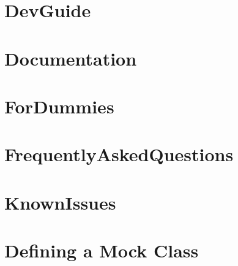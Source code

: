 \documentclass[twoside]{book}
\newcommand{\+}{\discretionary{\mbox{\scriptsize$\hookleftarrow$}}{}{}}
\begin{document}
\chapter{Dev\+Guide}
\label{md__home_bhargavi_Documents_SDR_Copy_Exam_808X_vendor_googletest_googlemock_docs_DevGuide}
\hypertarget{md__home_bhargavi_Documents_SDR_Copy_Exam_808X_vendor_googletest_googlemock_docs_DevGuide}{}

\chapter{Documentation}
\label{md__home_bhargavi_Documents_SDR_Copy_Exam_808X_vendor_googletest_googlemock_docs_Documentation}
\hypertarget{md__home_bhargavi_Documents_SDR_Copy_Exam_808X_vendor_googletest_googlemock_docs_Documentation}{}

\chapter{For\+Dummies}
\label{md__home_bhargavi_Documents_SDR_Copy_Exam_808X_vendor_googletest_googlemock_docs_ForDummies}
\hypertarget{md__home_bhargavi_Documents_SDR_Copy_Exam_808X_vendor_googletest_googlemock_docs_ForDummies}{}

\chapter{Frequently\+Asked\+Questions}
\label{md__home_bhargavi_Documents_SDR_Copy_Exam_808X_vendor_googletest_googlemock_docs_FrequentlyAskedQuestions}
\hypertarget{md__home_bhargavi_Documents_SDR_Copy_Exam_808X_vendor_googletest_googlemock_docs_FrequentlyAskedQuestions}{}

\chapter{Known\+Issues}
\label{md__home_bhargavi_Documents_SDR_Copy_Exam_808X_vendor_googletest_googlemock_docs_KnownIssues}
\hypertarget{md__home_bhargavi_Documents_SDR_Copy_Exam_808X_vendor_googletest_googlemock_docs_KnownIssues}{}

\chapter{Defining a Mock Class}
\label{md__home_bhargavi_Documents_SDR_Copy_Exam_808X_vendor_googletest_googlemock_docs_v1_5_CheatSheet}
\hypertarget{md__home_bhargavi_Documents_SDR_Copy_Exam_808X_vendor_googletest_googlemock_docs_v1_5_CheatSheet}{}

\end{document}
